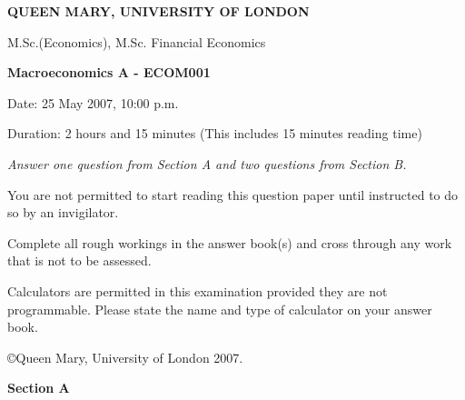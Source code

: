 \documentclass[12pt,a4paper]{article}
\begin{document}
\setcounter{page}{1}

\noindent\Large {\textbf{QUEEN MARY, UNIVERSITY OF LONDON }}
\newline 

\noindent \large {M.Sc.(Economics), M.Sc. Financial Economics\vspace{0.4cm} }

\noindent\textbf{\large Macroeconomics A - ECOM001}\vspace{0.4cm}

\noindent \large {Date: 25 May  2007, 10:00 p.m.

\noindent Duration: 2 hours and 15 minutes (This includes 15 minutes
reading time)}

\vspace{4cm}

\normalsize 
\em
\noindent  Answer one question from Section A and two
questions from Section B. 

\bigskip
\noindent You are not permitted to start reading this question paper
until instructed to do so by an invigilator.

\bigskip
\noindent Complete all rough workings in the answer
book(s) and cross through any work that is not to be assessed.

\bigskip
\noindent Calculators are permitted in this examination
provided they are not programmable. Please state the name and type
of calculator on your answer book.
\em

\vfill \noindent \copyright Queen Mary, University of London
2007.\newpage

\noindent \textbf{Section A} 
\end{document}
